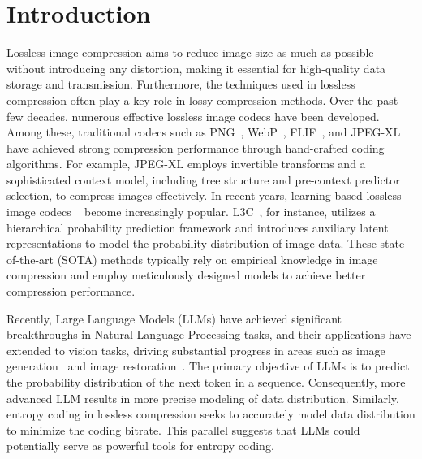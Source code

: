 \section{Introduction}
Lossless image compression aims to reduce image size as much as possible without introducing any distortion, making it essential for high-quality data storage and transmission. Furthermore, the techniques used in lossless compression often play a key role in lossy compression methods. 
Over the past few decades, numerous effective lossless image codecs have been developed. Among these, traditional codecs such as PNG~\cite{boutell1997png}, WebP~\cite{webp_tech_report}, FLIF~\cite{sneyers2016flif}, and JPEG-XL~\cite{alakuijala2019jpeg} have achieved strong compression performance through hand-crafted coding algorithms.
For example, JPEG-XL employs invertible transforms and a sophisticated context model, including tree structure and pre-context predictor selection, to compress images effectively. In recent years, learning-based lossless image codecs ~\cite{mentzer2019practical,mentzer2020learning,zhang2021ivpf,zhang2021iflow,bai2024deep} become increasingly popular. L3C~\cite{mentzer2019practical}, for instance, utilizes a hierarchical probability prediction framework and introduces auxiliary latent representations to model the probability distribution of image data. These state-of-the-art (SOTA) methods typically rely on empirical knowledge in image compression and employ meticulously designed models to achieve better compression performance.

Recently, Large Language Models (LLMs) have achieved significant breakthroughs in Natural Language Processing tasks, and their applications have extended to vision tasks, driving substantial progress in areas such as image generation~\cite{ge2024seed, Pang_2024_ICLR_frozen} and image restoration~\cite{zheng2024lm4lv}. The primary objective of LLMs is to predict the probability distribution of the next token in a sequence. Consequently, more advanced LLM results in more precise modeling of data distribution. Similarly, entropy coding in lossless compression seeks to accurately model data distribution to minimize the coding bitrate. This parallel suggests that LLMs could potentially serve as powerful tools for entropy coding. 

